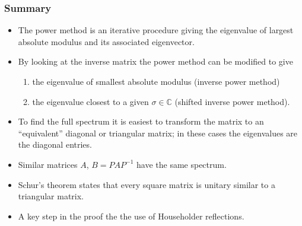 \documentclass{beamer}
\begin{document}
\begin{frame}
  \frametitle{Summary}

  \begin{itemize}
  \item The power method is an iterative procedure giving the
    eigenvalue of largest absolute modulus and its associated
    eigenvector.
  \item By looking at the inverse matrix the power method can be
    modified to give
    \begin{enumerate}
    \item the eigenvalue of smallest absolute modulus (inverse power
      method)
    \item the eigenvalue closest to a given $\sigma \in {\mathbb C}$
      (shifted inverse power method).
    \end{enumerate}
  \item To find the full spectrum it is easiest to transform the
    matrix to an ``equivalent'' diagonal or triangular matrix; in
    these cases the eigenvalues are the diagonal entries.
  \item Similar matrices $A$, $B = P A P^{-1}$ have the same
    spectrum.
  \item Schur's theorem states that every square matrix is unitary
    similar to a triangular matrix.
  \item A key step in the proof the the use of Householder
    reflections.
  \end{itemize}

\end{frame}
\end{document}
